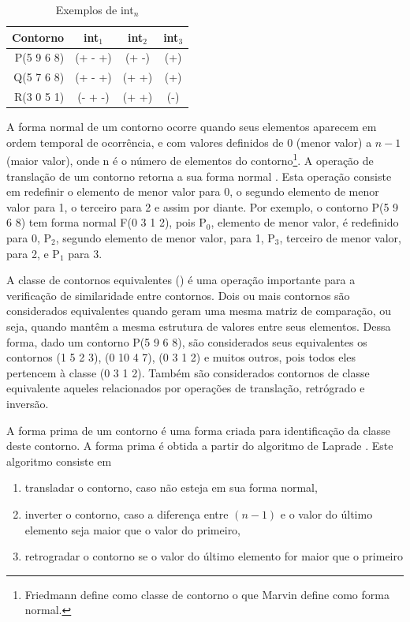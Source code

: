 \begin{table}
  \centering
  \begin{tabular}{r|ccc}
    Contorno & int$_1$ & int$_2$ & int$_3$ \\
    \hline
    P(5 9 6 8) & (+ - +) & (+ -) & (+) \\
    Q(5 7 6 8) & (+ - +) & (+ +) & (+) \\
    R(3 0 5 1) & (- + -) & (+ +) & (-)
  \end{tabular}
  \caption{Exemplos de int$_n$}
  \label{tab:int-contornos}
\end{table}

A forma normal de um contorno ocorre quando seus elementos aparecem em
ordem temporal de ocorrência, e com valores definidos de 0 (menor
valor) a $n-1$ (maior valor), onde n é o número de elementos do
contorno\footnote{Friedmann define como classe de contorno o que
  Marvin define como forma normal.}. A operação de translação de um
contorno retorna a sua forma normal
\cite[p. 228]{marvin.ea87:relating}. Esta operação consiste em
redefinir o elemento de menor valor para 0, o segundo elemento de
menor valor para 1, o terceiro para 2 e assim por diante. Por exemplo,
o contorno P(5 9 6 8) tem forma normal F(0 3 1 2), pois P$_0$,
elemento de menor valor, é redefinido para 0, P$_2$, segundo elemento
de menor valor, para 1, P$_3$, terceiro de menor valor, para 2, e
P$_1$ para 3.

A classe de contornos equivalentes () é uma operação importante
para a verificação de similaridade entre contornos. Dois ou mais
contornos são considerados equivalentes quando geram uma mesma matriz
de comparação, ou seja, quando mantêm a mesma estrutura de valores
entre seus elementos. Dessa forma, dado um contorno P(5 9 6 8), são
considerados seus equivalentes os contornos (1 5 2 3), (0 10 4 7), (0
3 1 2) e muitos outros, pois todos eles pertencem à classe (0 3 1
2). Também são considerados contornos de classe equivalente aqueles
relacionados por operações de translação, retrógrado e inversão.

A forma prima de um contorno é uma forma criada para identificação da
classe deste contorno. A forma prima é obtida a partir do algoritmo de
Laprade \cite[p. 234]{marvin.ea87:relating}. Este algoritmo consiste
em
\begin{enumerate}
\item transladar o contorno, caso não esteja em sua forma normal,
\item inverter o contorno, caso a diferença entre $(n - 1)$ e o valor
  do último elemento seja maior que o valor do primeiro,
\item retrogradar o contorno se o valor do último elemento for maior
  que o primeiro
\end{enumerate}

